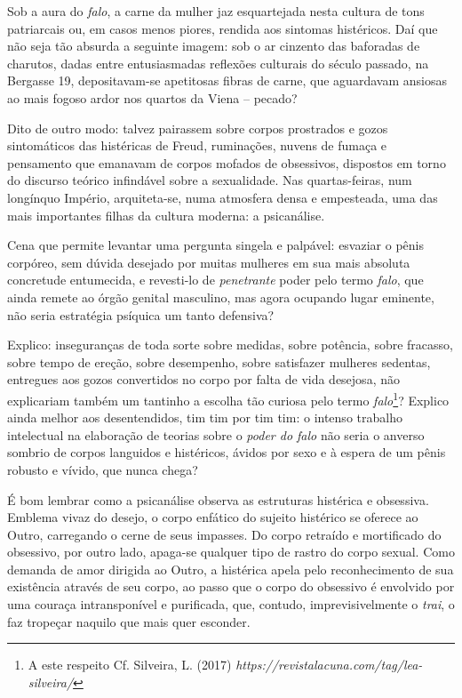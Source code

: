 Sob a aura do \emph{falo}, a carne da mulher jaz esquartejada nesta
cultura de tons patriarcais ou, em casos menos piores, rendida aos
sintomas histéricos. Daí que não seja tão absurda a seguinte imagem: sob
o ar cinzento das baforadas de charutos, dadas entre entusiasmadas
reflexões culturais do século passado, na Bergasse 19, depositavam-se
apetitosas fibras de carne, que aguardavam ansiosas ao mais fogoso ardor
nos quartos da Viena -- pecado?

Dito de outro modo: talvez pairassem sobre corpos prostrados e gozos
sintomáticos das histéricas de Freud, ruminações, nuvens de fumaça e
pensamento que emanavam de corpos mofados de obsessivos, dispostos em
torno do discurso teórico infindável sobre a sexualidade. Nas
quartas-feiras, num longínquo Império, arquiteta-se, numa atmosfera
densa e empesteada, uma das mais importantes filhas da cultura moderna:
a psicanálise.

Cena que permite levantar uma pergunta singela e palpável: esvaziar o
pênis corpóreo, sem dúvida desejado por muitas mulheres em sua mais
absoluta concretude entumecida, e revesti-lo de \emph{penetrante} poder
pelo termo \emph{falo}, que ainda remete ao órgão genital masculino, mas
agora ocupando lugar eminente, não seria estratégia psíquica um tanto
defensiva?

Explico: inseguranças de toda sorte sobre medidas, sobre potência, sobre
fracasso, sobre tempo de ereção, sobre desempenho, sobre satisfazer
mulheres sedentas, entregues aos gozos convertidos no corpo por falta de
vida desejosa, não explicariam também um tantinho a escolha tão curiosa
pelo termo \emph{falo}\footnote{A este respeito Cf. Silveira, L. (2017)
  \emph{https://revistalacuna.com/tag/lea-silveira/}}?
Explico ainda melhor aos desentendidos, tim tim por tim tim: o intenso
trabalho intelectual na elaboração de teorias sobre o \emph{poder do
falo} não seria o anverso sombrio de corpos languidos e histéricos,
ávidos por sexo e à espera de um pênis robusto e vívido, que nunca
chega?

É bom lembrar como a psicanálise observa as estruturas histérica e
obsessiva. Emblema vivaz do desejo, o corpo enfático do sujeito
histérico se oferece ao Outro, carregando o cerne de seus impasses. Do
corpo retraído e mortificado do obsessivo, por outro lado, apaga-se
qualquer tipo de rastro do corpo sexual. Como demanda de amor dirigida
ao Outro, a histérica apela pelo reconhecimento de sua existência
através de seu corpo, ao passo que o corpo do obsessivo é envolvido por
uma couraça intransponível e purificada, que, contudo, imprevisivelmente
o \emph{trai}, o faz tropeçar naquilo que mais quer esconder.

